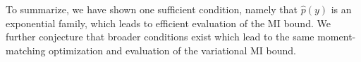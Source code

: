 To summarize, we have shown one sufficient condition, namely that
$\hat{p}(y)$ is an exponential family, which leads to efficient
evaluation of the MI bound.  We further conjecture that broader
conditions exist which lead to the same moment-matching optimization
and evaluation of the variational MI bound.





